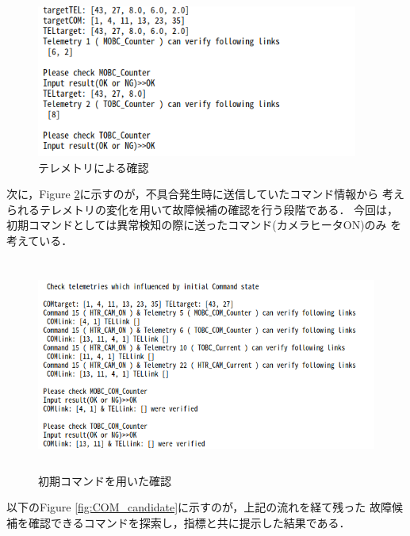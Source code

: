 \documentclass[11pt]{article}
\begin{document}
\begin{figure}[H]
   \centering
      \includegraphics[height=5.0cm]{figure/Tel_phase.png}
      \caption{テレメトリによる確認}
      \label{fig:tel_phase}
\end{figure}
次に，Figure \ref{fig:ini_COM_phase}に示すのが，不具合発生時に送信していたコマンド情報から
考えられるテレメトリの変化を用いて故障候補の確認を行う段階である．
今回は，初期コマンドとしては異常検知の際に送ったコマンド(カメラヒータON)のみ
を考えている．
\begin{figure}[H]
   \centering
      \includegraphics[height=7.0cm]{figure/initial_COM_phase.png}
      \caption{初期コマンドを用いた確認}
      \label{fig:ini_COM_phase}
\end{figure}
以下のFigure \ref{fig:COM_candidate}に示すのが，上記の流れを経て残った
故障候補を確認できるコマンドを探索し，指標と共に提示した結果である．
\end{document}
